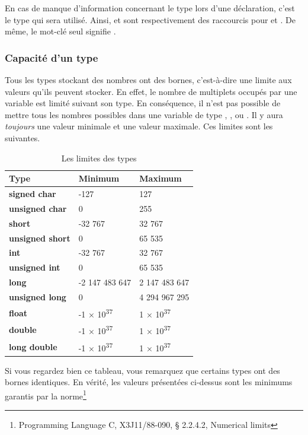 {\begin{infobox} En cas de manque d'information concernant le type
    lors d'une déclaration, c'est le type  qui sera
    utilisé. Ainsi,  et  sont respectivement
    des raccourcis pour  et . De
    même, le mot-clé  seul signifie .
\end{infobox}

\subsubsection{Capacité d'un type}
\label{capacite-dun-type}

Tous les types stockant des nombres ont des bornes, c'est-à-dire une
limite aux valeurs qu'ils peuvent stocker. En effet, le nombre de
multiplets occupés par une variable est limité suivant son type. En
conséquence, il n'est pas possible de mettre tous les nombres
possibles dans une variable de type , , ou
\mybox{double}. Il y aura \emph{toujours} une valeur minimale et une
valeur maximale. Ces limites sont les suivantes.

\begin{table}[ht!]
\centering
{}
\begin{tabular}{|l|l|l|}\hline
\rowcolor{gris-tab-entete}\textbf{Type} & \textbf{Minimum} & \textbf{Maximum}\tabularnewline\hline
\textbf{signed char} & -127 & 127\tabularnewline\hline
\textbf{unsigned char} & 0 & 255\tabularnewline\hline
\textbf{short} & -32 767 & 32 767\tabularnewline\hline
\textbf{unsigned short} & 0 & 65 535\tabularnewline\hline
\textbf{int} & -32 767 & 32 767\tabularnewline\hline
\textbf{unsigned int} & 0 & 65 535\tabularnewline\hline
\textbf{long} & -2 147 483 647 & 2 147 483 647\tabularnewline\hline
\textbf{unsigned long} & 0 & 4 294 967 295\tabularnewline\hline
\textbf{float} & -1 × 10\textsuperscript{37} & 1 × 10\textsuperscript{37}\tabularnewline\hline
\textbf{double} & -1 × 10\textsuperscript{37} & 1 × 10\textsuperscript{37}\tabularnewline\hline
\textbf{long double} & -1 × 10\textsuperscript{37} & 1 × 10\textsuperscript{37}\tabularnewline\hline
\end{tabular}
\caption{Les limites des types}
\end{table}

Si vous regardez bien ce tableau, vous remarquez que certains types ont
des bornes identiques. En vérité, les valeurs présentées ci-dessus sont
les minimums garantis par la norme\footnote{\footnotesize{Programming Language C,
  X3J11/88-090, § 2.2.4.2, Numerical limits}}

}
